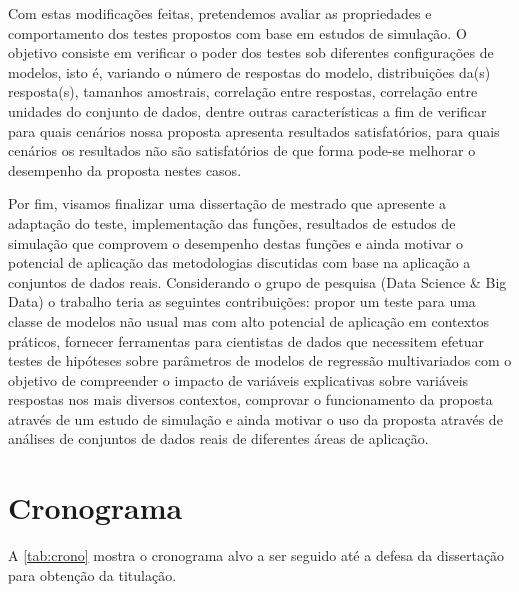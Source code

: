 Com estas modificações feitas, pretendemos avaliar as propriedades e comportamento dos testes propostos com base em estudos de simulação. O objetivo consiste em verificar o poder dos testes sob diferentes configurações de modelos, isto é, variando o número de respostas do modelo, distribuições da(s) resposta(s), tamanhos amostrais, correlação entre respostas, correlação entre unidades do conjunto de dados, dentre outras características a fim de verificar para quais cenários nossa proposta apresenta resultados satisfatórios, para quais cenários os resultados não são satisfatórios de que forma pode-se melhorar o desempenho da proposta nestes casos.

Por fim, visamos finalizar uma dissertação de mestrado que apresente a adaptação do teste, implementação das funções, resultados de estudos de simulação que comprovem o desempenho destas funções e ainda motivar o potencial de aplicação das metodologias discutidas com base na aplicação a conjuntos de dados reais. Considerando o grupo de pesquisa (Data Science \& Big Data) o trabalho teria as seguintes contribuições: propor um teste para uma classe de modelos não usual mas com alto potencial de aplicação em contextos práticos, fornecer ferramentas para cientistas de dados que necessitem efetuar testes de hipóteses sobre parâmetros de modelos de regressão multivariados com o objetivo de compreender o impacto de variáveis explicativas sobre variáveis respostas nos mais diversos contextos, comprovar o funcionamento da proposta através de um estudo de simulação e ainda motivar o uso da proposta através de análises de conjuntos de dados reais de diferentes áreas de aplicação.

\section{Cronograma}

A \autoref{tab:crono} mostra o cronograma alvo a ser seguido até a defesa da dissertação para obtenção da titulação.

